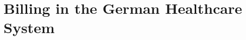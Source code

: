 \chapter{Billing in the German Healthcare System}\label{ch:billing-in-the-german-healthcare-system}




